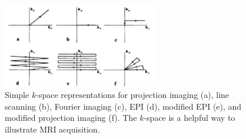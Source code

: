 \begin{figure}[!ht]
	\centering
	\includegraphics[width=0.6\textwidth, clip=true]{./Chapters/01_Introduction/Images/Kspace}
	\caption{Simple $k$-space representations \cite{Ljunggren1983} for projection imaging (a), line scanning (b), Fourier imaging (c), EPI (d), modified EPI (e), and modified projection imaging (f). The $k$-space is a helpful way to illustrate MRI acquisition.}
	\label{fig:kspace}
\end{figure}